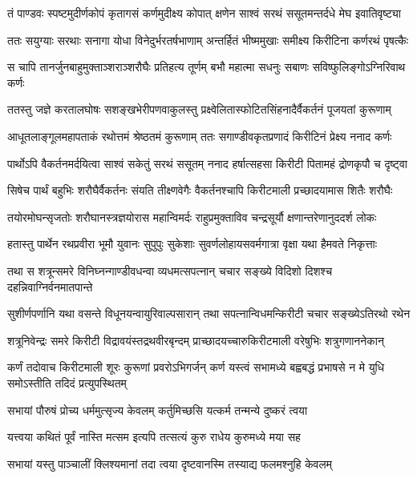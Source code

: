 \twolineshloka
{तं पाण्डवः स्पष्टमुदीर्णकोपं कृतागसं कर्णमुदीक्ष्य कोपात्}
{क्षणेन साश्वं सरथं ससूतमन्तर्दधे मेघ इवातिवृष्ट्या}


\twolineshloka
{ततः सयुग्याः सरथाः सनागा योधा विनेदुर्भरतर्षभाणाम्}
{अन्तर्हितं भीष्ममुखाः समीक्ष्य किरीटिना कर्णरथं पृषत्कैः}


\twolineshloka
{स चापि तानर्जुनबाहुमुक्ताञ्शराञ्शरौघैः प्रतिहत्य तूर्णम्}
{बभौ महात्मा सधनुः सबाणः सविष्फुलिङ्गोऽग्निरिवाथ कर्णः}


\twolineshloka
{ततस्तु जज्ञे करतालघोषः सशङ्खभेरीपणवाकुलस्तु}
{प्रक्ष्वेलितास्फोटितसिंहनादैर्वैकर्तनं पूजयतां कुरूणाम्}


\twolineshloka
{आधूतलाङ्गूलमहापताकं रथोत्तमं श्रेष्ठतमं कुरूणाम्}
{ततः सगाण्डीवकृतप्रणादं किरीटिनं प्रेक्ष्य ननाद कर्णः}


\twolineshloka
{पार्थोऽपि वैकर्तनमर्दयित्वा साश्वं सकेतुं सरथं ससूतम्}
{ननाद हर्षात्सहसा किरीटी पितामहं द्रोणकृपौ च दृष्ट्वा}


\twolineshloka
{सिषेच पार्थं बहुभिः शरौघैर्वैकर्तनः संयति तीक्ष्णवेगैः}
{वैकर्तनश्चापि किरीटमाली प्रच्छादयामास शितैः शरौघैः}


\twolineshloka
{तयोरमोघन्सृजतोः शरौघानस्त्रज्ञयोरास महान्विमर्दः}
{राहुप्रमुक्ताविव चन्द्रसूर्यौ क्षणान्तरेणानुददर्श लोकः}


\twolineshloka
{हतास्तु पार्थेन रथप्रवीरा भूमौ युवानः सुपुपुः सुकेशाः}
{सुवर्णलोहायसवर्मगात्रा वृक्षा यथा हैमवते निकृत्ताः}


\twolineshloka
{तथा स शत्रून्समरे विनिघ्नन्गाण्डीवधन्वा व्यधमत्सपत्नान्}
{चचार सङ्ख्ये विदिशो दिशश्च दहन्निवाग्निर्वनमातपान्ते}


\twolineshloka
{सुशीर्णपर्णानि यथा वसन्ते विधूनयन्वायुरिवाल्पसारान्}
{तथा सपत्नान्विधमन्किरीटी चचार सङ्ख्येऽतिरथो रथेन}


\twolineshloka
{शत्रूनिवेन्द्रः समरे किरीटी विद्रावयंस्तद्रथवीरबृन्दम्}
{प्राच्छादयच्चारुकिरीटमाली वरेषुभिः शत्रुगणाननेकान्}


\onelineshloka
{कर्णं तदोवाच किरीटमाली शूरः कुरूणां प्रवरोऽभिगर्जन्}
\twolineshloka
{कर्ण यस्त्वं सभामध्ये बह्वबद्धं प्रभाषसे}
{न मे युधि समोऽस्तीति तदिदं प्रत्युपस्थितम्}


\twolineshloka
{सभायां पौरुषं प्रोच्य धर्ममुत्सृज्य केवलम्}
{कर्तुमिच्छसि यत्कर्म तन्मन्ये दुष्करं त्वया}



\twolineshloka
{यत्त्वया कथितं पूर्वं नास्ति मत्सम इत्यपि}
{तत्सत्यं कुरु राधेय कुरुमध्ये मया सह}


\twolineshloka
{सभायां यस्तु पाञ्चालीं क्लिश्यमानां तदा त्वया}
{दृष्टवानस्मि तस्याद्य फलमश्नुहि केवलम्}


